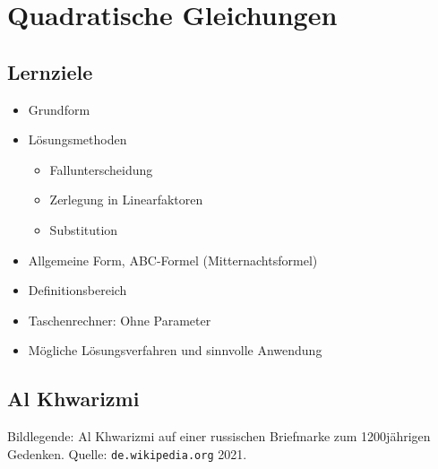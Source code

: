 \section{Quadratische Gleichungen}


\newpage

\subsection*{Lernziele}

\begin{itemize}
\item Grundform
\item Lösungsmethoden
  \begin{itemize}
    \item{Fallunterscheidung}
    \item{Zerlegung in Linearfaktoren}
    \item{Substitution}
  \end{itemize}
\item Allgemeine Form, ABC-Formel (Mitternachtsformel)
\item Definitionsbereich
\item Taschenrechner: Ohne Parameter
\item Mögliche Lösungsverfahren und sinnvolle Anwendung
\end{itemize}
\newpage

\TALS{}

\subsection{Al Khwarizmi}
Bildlegende: Al Khwarizmi auf einer russischen Briefmarke zum
1200jährigen Gedenken. Quelle: \texttt{de.wikipedia.org} 2021.

